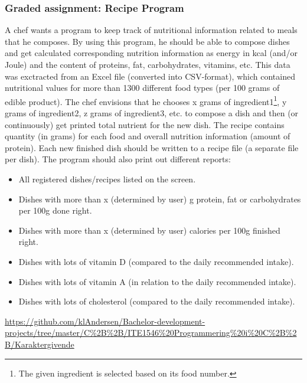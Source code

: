 \subsubsection{Graded assignment: Recipe Program}
\label{sec:recipe_program}
A chef wants a program to keep track of nutritional information related to meals that he composes. 
By using this program, he should be able to compose dishes and get calculated corresponding nutrition information as energy in kcal (and/or Joule) and the content of proteins,
fat, carbohydrates, vitamins, etc.
This data was exctracted from an Excel file (converted into CSV-format), which contained nutritional values for more than 1300 different food types (per 100 grams of edible product). 
\vspace{0.5em}\newline
The chef envisions that he chooses x grams of ingredient1\footnote{
	The given ingredient is selected based on its food number.
}, y grams of ingredient2, z grams of ingredient3, etc. to compose a dish and then (or continuously) get printed total nutrient for the new dish.  
The recipe contains quantity (in grams) for each food and overall nutrition information (amount of protein). 
Each new finished dish should be written to a recipe file (a separate file per dish).
\vspace{0.5em}\newline
The program should also print out different reports:
\begin{itemize}
	\item All registered dishes/recipes listed on the screen.
	\item Dishes with more than x (determined by user) g protein, fat or carbohydrates per 100g done right.
	\item Dishes with more than x (determined by user) calories per 100g finished right.
	\item Dishes with lots of vitamin D (compared to the daily recommended intake).
	\item Dishes with lots of vitamin A (in relation to the daily recommended intake).
	\item Dishes with lots of cholesterol (compared to the daily recommended intake).
\end{itemize}
 \url{https://github.com/klAndersen/Bachelor-development-projects/tree/master/C%2B%2B/ITE1546%20Programmering%20i%20C%2B%2B/Karaktergivende}


